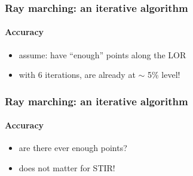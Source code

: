 \documentclass{beamer}
\begin{document}
\begin{frame}
  \frametitle{Ray marching: an iterative algorithm}
  \framesubtitle{Accuracy}
  \begin{itemize}
    \item assume: have ``enough'' points along the LOR
  \end{itemize}
  \begin{figure}
    \centering
  \end{figure}
  \begin{itemize}
    \item with 6 iterations, are already at $\sim$ 5\% level!
  \end{itemize}
\end{frame}

\begin{frame}
  \frametitle{Ray marching: an iterative algorithm}
  \framesubtitle{Accuracy}
  \begin{itemize}
    \item are there ever enough points?
  \end{itemize}

  \begin{itemize}
    \item does not matter for STIR!
  \end{itemize}
\end{frame}
\end{document}
